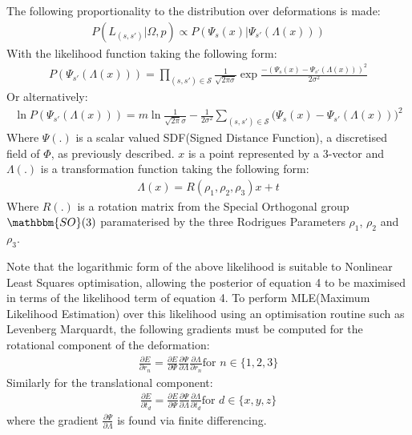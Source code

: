 The following proportionality to the distribution over deformations is made:
\begin{equation}
\begin{split}
P(L_{(s, s')} | \Omega, p) \propto P(\Psi_{s}(x) | \Psi_{s'}(\Lambda(x)))
\end{split}
\end{equation}
With the likelihood function taking the following form:
\begin{equation}
\begin{split}
P(\Psi_{s'}(\Lambda(x))) = \prod_{(s, s') \in \mathcal{S}} \frac{1}{\sqrt{2 \pi \sigma}} \exp{\frac{-(\Psi_{s}(x) - \Psi_{s'}(\Lambda(x)))^2}{2\sigma^2}}
\end{split}
\end{equation}
Or alternatively:
\begin{equation}
\begin{split}
\ln P(\Psi_{s'}(\Lambda(x))) = m\ln\frac{1}{\sqrt{2\pi}\sigma}
-\frac{1}{2\sigma^2} \sum_{(s, s') \in \mathcal{S}} \bigg( \Psi_{s}(x) - \Psi_{s'}(\Lambda(x)) \bigg)^2
\end{split}
\end{equation}
Where $\Psi(.)$ is a scalar valued SDF(Signed Distance Function), a discretised field of $\Phi$, as previously described. $x$ is a point represented by a 3-vector and $\Lambda(.)$ is a transformation function taking the following form:
\begin{equation}
\begin{split}
\Lambda(x) = R(\rho_{1}, \rho_{2}, \rho_{3})x + t
\end{split}
\end{equation}
Where $R(.)$ is a rotation matrix from the Special Orthogonal group $\mathbbm{SO}(3)$ paramaterised by the three 
Rodrigues Parameters \cite{Shuster1993} $\rho_{1}$, $\rho_{2}$ and $\rho_{3}$.

Note that the logarithmic form of the above likelihood is suitable to Nonlinear Least Squares optimisation, allowing the posterior of equation 4 
to be maximised in terms of the likelihood term of equation 4. To perform MLE(Maximum Likelihood Estimation) over this likelihood using 
an optimisation routine such as Levenberg Marquardt, the following gradients must be computed for the rotational component of the 
deformation:
\begin{equation}
\begin{split}
\frac{\partial E}{\partial r_{n}} = \frac{\partial E}{\partial \Psi} \frac{\partial \Psi}{\partial \Lambda} \frac{\partial \Lambda}{\partial r_{n}} \text{for } n \in \{1,2,3\}
\end{split}
\end{equation}
Similarly for the translational component:
\begin{equation}
\begin{split}
\frac{\partial E}{\partial t_{d}} = \frac{\partial E}{\partial \Psi} \frac{\partial \Psi}{\partial \Lambda} \frac{\partial \Lambda}{\partial t_{d}} \text{for } d \in  \{x,y,z\}
\end{split}
\end{equation}
where the gradient $\frac{\partial \Psi}{\partial \Lambda}$ is found via finite differencing.

